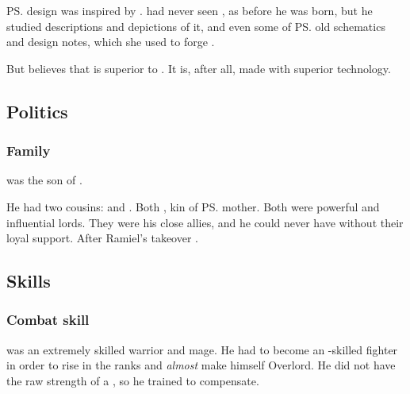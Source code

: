 \ps{\Scaleron} design was inspired by . 
\Dasteron{} had never seen \Ascaril, as  before he was born, but he studied descriptions and depictions of it, and even some of \ps{} old schematics and design notes, which she used to forge \Ascaril. 

But \Dasteron{} believes that \Scaleron{} is superior to \Ascaril. 
It is, after all, made with superior technology. 









\subsection{Politics}





\subsubsection{Family}
\Dasteron{} was the son of . 

He had two cousins: 
\Sargamel and \Themirod. 
Both \thelyadeth, kin of \ps{\Dasteron} mother. 
Both were powerful and influential \Mystraacht lords. 
They were his close allies, and he could never have  without their loyal support. 
After Ramiel's takeover . 









\subsection{Skills}





\subsubsection{Combat skill}
\Dasteron{} was an extremely skilled warrior and mage. 
He had to become an \uber-skilled fighter in order to rise in the \Mystraacht{} ranks and \emph{almost} make himself Overlord. 
He did not have the raw strength of a \sathariah, so he trained to compensate. 


